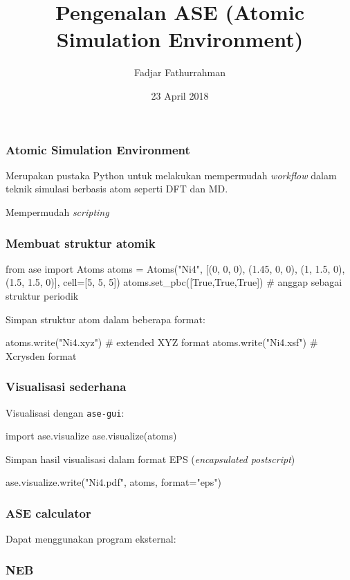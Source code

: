 \documentclass[bahasa,10pt]{beamer}
\begin{document}
\title{Pengenalan ASE (Atomic Simulation Environment)}
\author{Fadjar Fathurrahman}
\date{23 April 2018}

\frame{\titlepage}

\begin{frame}
\frametitle{Atomic Simulation Environment}

Merupakan pustaka Python untuk melakukan mempermudah \textit{workflow}
dalam teknik simulasi berbasis atom seperti DFT dan MD.

Mempermudah \textit{scripting}

\end{frame}



\begin{frame}[fragile]
\frametitle{Membuat struktur atomik}

\begin{pythoncode}
from ase import Atoms
atoms = Atoms("Ni4", [(0, 0, 0),
                      (1.45, 0, 0),
                      (1, 1.5, 0),
                      (1.5, 1.5, 0)],
               cell=[5, 5, 5])
atoms.set_pbc([True,True,True])  # anggap sebagai struktur periodik
\end{pythoncode}

Simpan struktur atom dalam beberapa format:
\begin{pythoncode}
atoms.write("Ni4.xyz")  # extended XYZ format
atoms.write("Ni4.xsf")  # Xcrysden format
\end{pythoncode}

\end{frame}



\begin{frame}[fragile]
\frametitle{Visualisasi sederhana}

Visualisasi dengan \texttt{ase-gui}:
\begin{pythoncode}
import ase.visualize
ase.visualize(atoms)
\end{pythoncode}

Simpan hasil visualisasi dalam format EPS (\textit{encapsulated postscript})
\begin{pythoncode}
ase.visualize.write("Ni4.pdf", atoms, format="eps")
\end{pythoncode}

\end{frame}


\begin{frame}
\frametitle{ASE calculator}

Dapat menggunakan program eksternal:

\end{frame}



\begin{frame}
\frametitle{NEB}


\end{frame}
\end{document}
